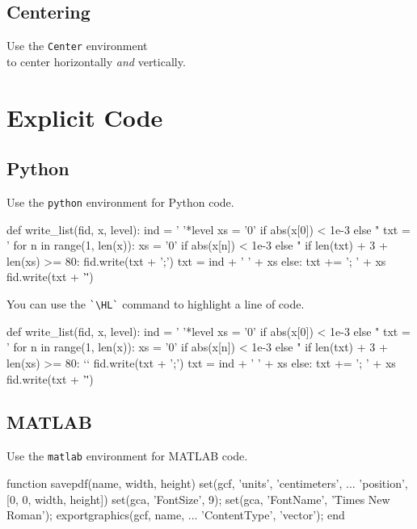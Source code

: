\documentclass{antclass}
\newif\ifshow\showtrue
\begin{document}
\section{Centering}

\begin{Center}
  \Large Use the \texttt{Center} environment \\
  to center horizontally \emph{and} vertically.
\end{Center}

\chapter{Explicit Code}

\section{Python}\onecolumn

\ifshow
  Use the \verb|python| environment for Python code.
  \begin{python}
    def write_list(fid, x, level):
    ind = '  '*level
    xs = '0' if abs(x[0]) < 1e-3 else "%
    txt = '\n%
    for n in range(1, len(x)):
    xs = '0' if abs(x[n]) < 1e-3 else "%
    if len(txt) + 3 + len(xs) >= 80:
    fid.write(txt + ';\n')
    txt = ind + '  ' + xs
    else:
    txt += '; ' + xs
    fid.write(txt + '\"')
  \end{python}
  \pagebreak\addtocounter{page}{-1}
\fi
You can use the \verb|`\HL`| command to highlight a line of code.
\begin{python}
  def write_list(fid, x, level):
  ind = '  '*level
  xs = '0' if abs(x[0]) < 1e-3 else "%
  txt = '\n%
  for n in range(1, len(x)):
  xs = '0' if abs(x[n]) < 1e-3 else "%
  if len(txt) + 3 + len(xs) >= 80:
  `\HL`            fid.write(txt + ';\n')
  txt = ind + '  ' + xs
  else:
  txt += '; ' + xs
  fid.write(txt + '\"')
\end{python}

\section{MATLAB}

Use the \verb|matlab| environment for MATLAB code.
\begin{matlab}
  function savepdf(name, width, height)
  set(gcf, 'units', 'centimeters', ...
  'position', [0, 0, width, height])
  set(gca, 'FontSize', 9);
  set(gca, 'FontName', 'Times New Roman');
  exportgraphics(gcf, name, ...
  'ContentType', 'vector');
  end
\end{matlab}
\end{document}
